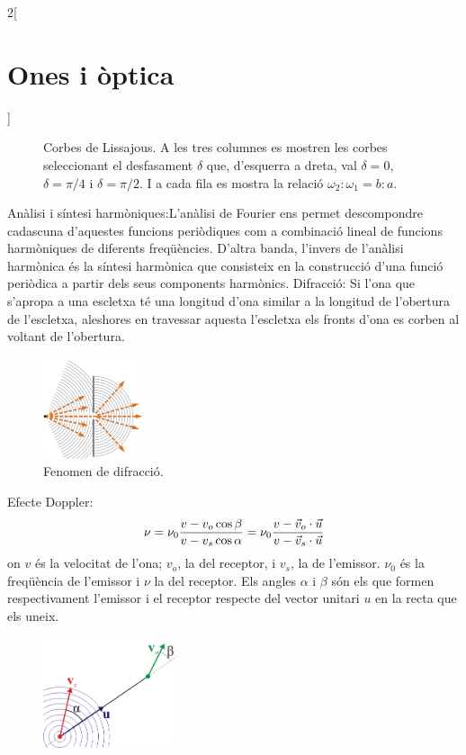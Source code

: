 \documentclass[class=article,10pt,crop=false]{standalone}
\begin{document}
\begin{multicols}{2}[\section{Ones i òptica}]
\begin{itemize}
\begin{figure}
       \caption{Corbes de Lissajous. A les tres columnes es mostren les corbes seleccionant el desfasament $\delta$ que, d'esquerra a dreta, val $\delta=0$, $\delta=\pi/4$ i $\delta=\pi/2$. I a cada fila es mostra la relació $\omega_2:\omega_1=b:a$.}
       \label{liss}
    \end{figure}
\end{itemize}
Anàlisi i síntesi harmòniques:\newline L'anàlisi de Fourier ens permet descompondre cadascuna d'aquestes funcions pe\-riò\-di\-ques com a combinació lineal de funcions harmòniques de diferents freqüències. D'altra banda, l'invers de l'anàlisi harmònica és la síntesi harmònica que consisteix en la construcció d'una funció periòdica a partir dels seus components harmònics.\newline
Difracció: Si l'ona que s'apropa a una es\-clet\-xa té una longitud d'ona similar a la longitud de l'obertura de l'escletxa, aleshores en tra\-ves\-sar aquesta l'escletxa els fronts d'ona es corben al voltant de l'obertura.\newline
\begin{figure}
   \centering
   \includegraphics[width=2.95cm]{Physics/1st/Ones_i_optica/Imatges/diff.jpg}
   \caption{Fenomen de difracció.}
   \label{diff}
\end{figure}
Efecte Doppler:
\begin{equation*}
    \nu=\nu_0\frac{v-v_o\cos\beta}{v- v_s\cos\alpha}=\nu_0\frac{v-\Vec{v}_o\cdot\Vec{u}}{v- \Vec{v}_s\cdot\Vec{u}}\\
\end{equation*}
{\footnotesize on $v$ és la velocitat de l'ona; $v_o$, la del receptor, i $v_s$, la de l'emissor. $\nu_0$ és la freqüència de l'emissor i $\nu$ la del receptor. Els angles $\alpha$ i $\beta$ són els que formen respectivament l'emissor i el receptor respecte del vector unitari $u$ en la recta que els uneix.}\newline
\begin{figure}
   \centering
   \includegraphics[width=4cm]{Physics/1st/Ones_i_optica/Imatges/dopp.png}

\end{figure}
\end{multicols}
\end{document}
